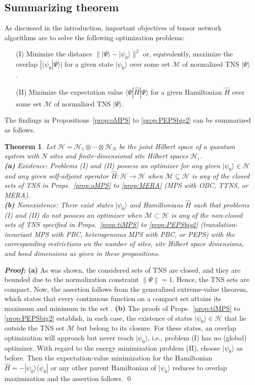 \documentclass[english,11pt,aps,pra,onecolumn,tightenlines,groupedaddress,superscriptaddress,notitlepage,floatfix,fleqn]{revtex4-1}
\newcommand{\bra}{\langle}
\newcommand{\ket}{\rangle}
\newcommand{\hH}{\hat{H}}
\newcommand{\mc}[1]{\mathcal{#1}}
\renewcommand{\H}{\mc{H}}
\newcommand{\M}{\mc{M}}
\newcommand{\Emph}[1]{\textbf{\emph{#1}}}
\newtheorem*{theorem}{Theorem}
\begin{document}
\subsection{Summarizing theorem}\label{sec:discussTheorem}
As discussed in the introduction, important objectives of tensor network algorithms are to solve the following optimization problems:
\begin{enumerate}
 \item[(I)] Minimize the distance $\||\Psi\ket-|\psi_0\ket\|^2$ or, equivalently, maximize the overlap $|\bra\psi_0|\Psi\ket|$ for a given state $|\psi_0\ket$ over some set $\M$ of normalized TNS $|\Psi\ket$.
 \item[(II)] Minimize the expectation value $\bra\Psi|\hH|\Psi\ket$ for a given Hamiltonian $\hH$ over some set $\M$ of normalized TNS $|\Psi\ket$.
\end{enumerate}
The findings in Propositions~\ref{prop:oMPS} to \ref{prop:PEPSbig2} can be summarized as follows.
\begin{theorem} Let $\H=\H_1\otimes \dotsb \otimes \H_N$ be the joint Hilbert space of a quantum system with $N$ sites and finite-dimensional site Hilbert spaces $\H_i$.\\[2pt]
\textbf{(a)} Existence: Problems (I) and (II) possess an optimizer for any given $|\psi_0\ket\in\H$ and any given self-adjoint operator $\hH:\H \to \H$ when $\M\subseteq\H$ is any of the closed sets of TNS in Props.~\ref{prop:oMPS} to \ref{prop:MERA} (MPS with OBC, TTNS, or MERA).\\[2pt]
\textbf{(b)} Nonexistence: There exist states $|\psi_0\ket$ and Hamiltonians $\hH$ such that problems (I) and (II) do not possess an optimizer when $\M\subset\H$ is any of the non-closed sets of TNS specified in Props.~\ref{prop:tiMPS} to \ref{prop:PEPSbig2} (translation-invariant MPS with PBC, heterogeneous MPS with PBC, or PEPS) with the corresponding restrictions on the number of sites, site Hilbert space dimensions, and bond dimensions as given in these propositions.
\end{theorem}
\Emph{Proof:}
\textbf{(a)} As was shown, the considered sets of TNS are closed, and they are bounded due to the normalization constraint $\|\Psi\|=1$. Hence, the TNS sets are compact. Now, the assertion follows from the generalized extreme-value theorem, which states that every continuous function on a compact set attains its maximum and minimum in the set \cite{Rudin1976}.
\textbf{(b)} The proofs of Props.~\ref{prop:tiMPS} to \ref{prop:PEPSbig2} establish, in each case, the existence of states $|\psi_0\ket\in\H$ that lie outside the TNS set $\M$ but belong to its closure. For these states, an overlap optimization will approach but never reach $|\psi_0\ket$, i.e., problem (I) has no (global) optimizer. With regard to the energy minimization problem (II), choose $|\psi_0\ket$ as before. Then the expectation-value minimization for the Hamiltonian $\hH=-|\psi_0\ket\bra\psi_0|$ or any other parent Hamiltonian \cite{Fannes1992-144,PerezGarcia2007-7,PerezGarcia2008-8} of $|\psi_0\ket$ reduces to overlap maximization and the assertion follows. \qed
\end{document}
